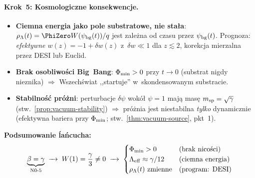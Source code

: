 \paragraph{Krok~5: Kosmologiczne konsekwencje.}
\begin{itemize}[nosep]
  \item \textbf{Ciemna energia jako pole substratowe, nie sta\l{}a}:
    $\rho_\Lambda(t) = \PhiZero W(\psi_{\rm bg}(t))/q$
    jest zale\.zna od czasu przez $\psi_{\rm bg}(t)$.
    Prognoza: \emph{efektywne $w(z) = -1 + \delta w(z)$} z~$\delta w \ll 1$
    dla $z \lesssim 2$, korekcja mierzalna przez DESI lub Euclid.
  \item \textbf{Brak osobliwo\'sci Big~Bang}:
    $\Phi_{\rm min} > 0$ przy $t \to 0$ (substrat nigdy nieznika)
    $\Rightarrow$ Wszech\'swiat ,,startuje'' w~skondensowanym substracie.
  \item \textbf{Stabilno\'s\'c pr\'o\.zni}: perturbacje $\delta\psi$ wok\'o\l{}
    $\psi = 1$ maj\k{a} mas\k{e} $m_{\rm sp} = \sqrt{\gamma}$ (stw.~\ref{prop:vacuum-stability})
    $\Rightarrow$ pr\'o\.znia jest niestabilna \emph{tylko} dynamicznie (efektywna bariera
    przy $\Phi_{\rm min}$; stw.~\ref{thm:vacuum-source}, pkt~1).
\end{itemize}

\medskip\noindent
\textbf{Podsumowanie \'la\'ncu\-cha:}
\[
  \underbrace{\beta = \gamma}_{\text{N0-5}}
  \;\xrightarrow{\phantom{X}}\;
  W(1) = \frac{\gamma}{3} \neq 0
  \;\xrightarrow{\phantom{X}}\;
  \begin{cases}
    \Phi_{\rm min} > 0 & \text{(brak nico\'sci)}\\
    \Lambda_{\rm eff} \approx \gamma/12 & \text{(ciemna energia)}\\
    \rho_\Lambda(t) \text{ zmienne} & \text{(program: DESI)}
  \end{cases}
\]

